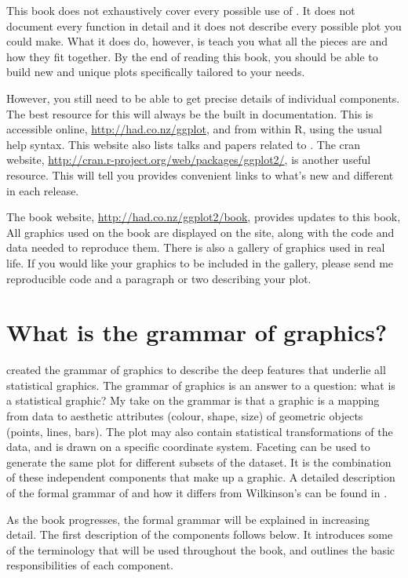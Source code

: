 This book does not exhaustively cover every possible use of \ggplot.  It does not document every function in detail and it does not describe every possible plot you could make.  What it does do, however, is teach you what all the pieces are and how they fit together.  By the end of reading this book, you should be able to build new and unique plots specifically tailored to your needs.  

However, you still need to be able to get precise details of individual components.  The best resource for this will always be the built in documentation.  This is accessible online, \url{http://had.co.nz/ggplot}, and from within R, using the usual help syntax. This website also lists talks and papers related to \ggplot.  The {\sc cran} website, \url{http://cran.r-project.org/web/packages/ggplot2/}, is another useful resource.  This will tell you provides convenient links to what's new and different in each release.

The book website, \url{http://had.co.nz/ggplot2/book}, provides updates to this book,   All graphics used on the book are displayed on the site, along with the code and data needed to reproduce them.  There is also a gallery of \ggplot graphics used in real life.  If you would like your graphics to be included in the gallery, please send me reproducible code and a paragraph or two describing your plot.


\section{What is the grammar of graphics?}

\citet{wilkinson:2006} created the grammar of graphics to describe the deep features that underlie all statistical graphics.  The grammar of graphics is an answer to a question: what is a statistical graphic?  My take on the grammar is that a graphic is a mapping from data to  aesthetic attributes (colour, shape, size) of geometric objects (points, lines, bars).  The plot may also contain statistical transformations of the data, and is drawn on a specific  coordinate system.  Faceting can be used to generate the same plot for different subsets of the dataset.  It is the combination of these independent components that make up a graphic.  A detailed description of the formal grammar of \ggplot and how it differs from Wilkinson's can be found in \citet{wickham:2007d}.

As the book progresses, the formal grammar will be explained in increasing detail.  The first description of the components follows below.  It introduces some of the terminology that will be used throughout the book, and outlines the basic responsibilities of each component.  

